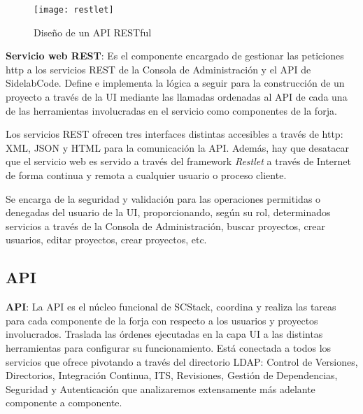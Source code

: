\begin{figure}[H]
    \centering
    \texttt{[image: restlet]}
    \caption{Diseño de un API RESTful}
    \label{fig:restful-api}
\end{figure}

\par \textbf{Servicio web REST}: Es el componente encargado de gestionar las peticiones http a los servicios REST de la Consola de Administración y el API de SidelabCode. Define e implementa la lógica a seguir para la construcción de un proyecto a través de la UI mediante las llamadas ordenadas al API de cada una de las herramientas involucradas en el servicio como componentes de la forja.

\par Los servicios REST ofrecen tres interfaces distintas accesibles a través de http: XML, JSON y HTML para la comunicación la API. Además, hay que desatacar que el servicio web es servido a través del framework \emph{Restlet} a través de Internet de forma continua y remota a cualquier usuario o proceso cliente.

\par Se encarga de la seguridad y validación para las operaciones permitidas o denegadas del usuario de la UI, proporcionando, según su rol, determinados servicios a través de la Consola de Administración, buscar proyectos, crear usuarios, editar proyectos, crear proyectos, etc.



\subsection{API}
\label{sub:api}

\par \textbf{API}: La API es el núcleo funcional de SCStack, coordina y realiza las tareas para cada componente de la forja con respecto a los usuarios y proyectos involucrados. Traslada las órdenes ejecutadas en la capa UI a las distintas herramientas para configurar su funcionamiento. Está conectada a todos los servicios que ofrece pivotando a través del directorio LDAP: Control de Versiones, Directorios, Integración Continua, ITS, Revisiones, Gestión de Dependencias, Seguridad y Autenticación que analizaremos extensamente más adelante componente a componente.

